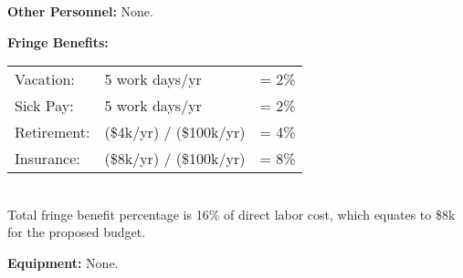 \documentclass[11pt]{article}
\begin{document}
{\bf Other Personnel:} None.


{\bf Fringe Benefits:} \\
\begin{tabular}{lll}
Vacation:     &  5 work days/yr         & = 2\%  \\
Sick Pay:     &  5 work days/yr         & = 2\%  \\
Retirement:   & (\$4k/yr) / (\$100k/yr) & = 4\%  \\
Insurance:    & (\$8k/yr) / (\$100k/yr) & = 8\%  \\
\end{tabular}  \\
Total fringe benefit percentage is 16\% of direct labor cost, which equates to \$8k for the proposed budget.


{\bf Equipment:} None.
\end{document}

